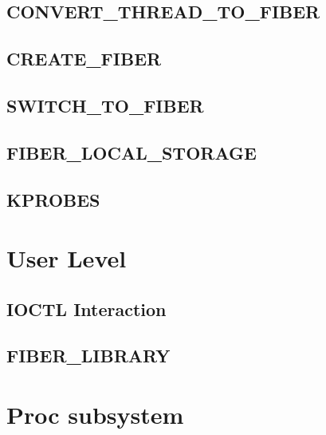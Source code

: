 \documentclass[a4paper]{article}
\begin{document}
\subsection*{CONVERT\_THREAD\_TO\_FIBER}
\subsection*{CREATE\_FIBER}
\subsection*{SWITCH\_TO\_FIBER}
\subsection*{FIBER\_LOCAL\_STORAGE}
\subsection*{KPROBES}

\section{User Level}
\subsection*{IOCTL Interaction}
\subsection*{FIBER\_LIBRARY}

\section{Proc subsystem}
\end{document}
